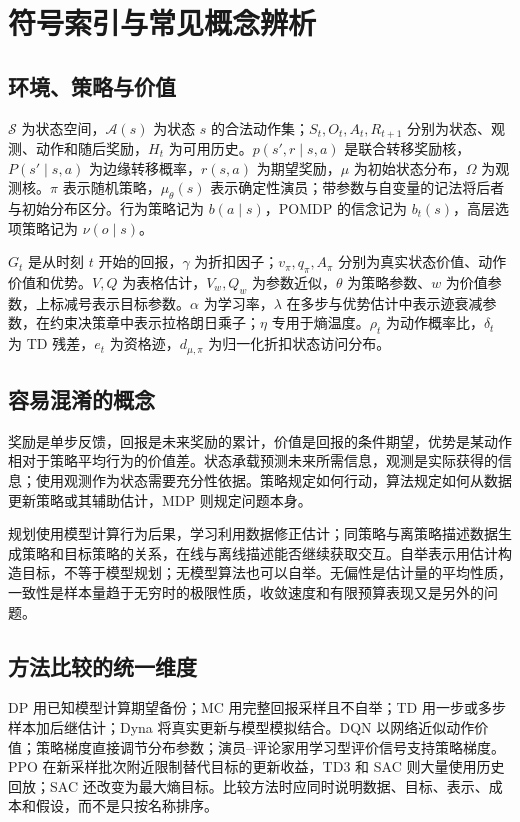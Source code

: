 \setcounter{chapter}{0} %
\chapter{符号索引与常见概念辨析}
\label{app:rl-notation}

\section{环境、策略与价值}

$\mathcal S$ 为状态空间，$\mathcal A(s)$ 为状态 $s$ 的合法动作集；$S_t,O_t,A_t,R_{t+1}$ 分别为状态、观测、动作和随后奖励，$H_t$ 为可用历史。$p(s',r\mid s,a)$ 是联合转移奖励核，$P(s'\mid s,a)$ 为边缘转移概率，$r(s,a)$ 为期望奖励，$\mu$ 为初始状态分布，$\Omega$ 为观测核。$\pi$ 表示随机策略，$\mu_\theta(s)$ 表示确定性演员；带参数与自变量的记法将后者与初始分布区分。行为策略记为 $b(a\mid s)$，POMDP 的信念记为 $b_t(s)$，高层选项策略记为 $\nu(o\mid s)$。

$G_t$ 是从时刻 $t$ 开始的回报，$\gamma$ 为折扣因子；$v_\pi,q_\pi,A_\pi$ 分别为真实状态价值、动作价值和优势。$V,Q$ 为表格估计，$V_w,Q_w$ 为参数近似，$\theta$ 为策略参数、$w$ 为价值参数，上标减号表示目标参数。$\alpha$ 为学习率，$\lambda$ 在多步与优势估计中表示迹衰减参数，在约束决策章中表示拉格朗日乘子；$\eta$ 专用于熵温度。$\rho_t$ 为动作概率比，$\delta_t$ 为 TD 残差，$e_t$ 为资格迹，$d_{\mu,\pi}$ 为归一化折扣状态访问分布。

\section{容易混淆的概念}

奖励是单步反馈，回报是未来奖励的累计，价值是回报的条件期望，优势是某动作相对于策略平均行为的价值差。状态承载预测未来所需信息，观测是实际获得的信息；使用观测作为状态需要充分性依据。策略规定如何行动，算法规定如何从数据更新策略或其辅助估计，MDP 则规定问题本身。

规划使用模型计算行为后果，学习利用数据修正估计；同策略与离策略描述数据生成策略和目标策略的关系，在线与离线描述能否继续获取交互。自举表示用估计构造目标，不等于模型规划；无模型算法也可以自举。无偏性是估计量的平均性质，一致性是样本量趋于无穷时的极限性质，收敛速度和有限预算表现又是另外的问题。

\section{方法比较的统一维度}

DP 用已知模型计算期望备份；MC 用完整回报采样且不自举；TD 用一步或多步样本加后继估计；Dyna 将真实更新与模型模拟结合。DQN 以网络近似动作价值；策略梯度直接调节分布参数；演员--评论家用学习型评价信号支持策略梯度。PPO 在新采样批次附近限制替代目标的更新收益，TD3 和 SAC 则大量使用历史回放；SAC 还改变为最大熵目标。比较方法时应同时说明数据、目标、表示、成本和假设，而不是只按名称排序。






